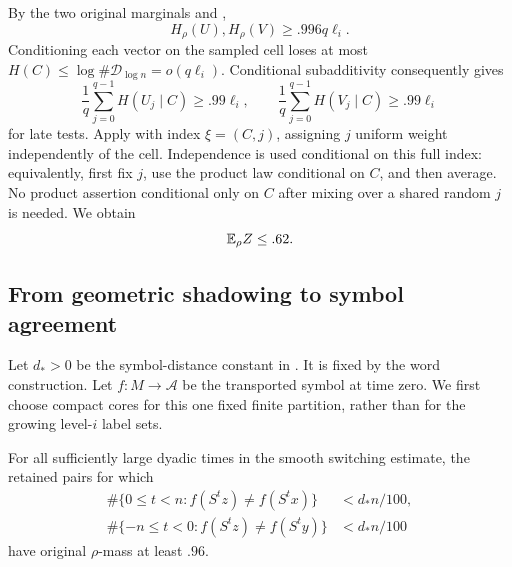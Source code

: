 By the two original marginals and ,
\[
 H_\rho(U),H_\rho(V)\ge .996q\ell_i.
\]
Conditioning each vector on the sampled cell loses at most
$H(C)\le\log\#\mathcal D_{\log n}=o(q\ell_i)$. Conditional
subadditivity consequently gives
\begin{equation}\label{eq:entry-entropies}
 \frac1q\sum_{j=0}^{q-1}H(U_j\mid C)\ge .99\ell_i,
 \qquad
 \frac1q\sum_{j=0}^{q-1}H(V_j\mid C)\ge .99\ell_i
\end{equation}
for late tests. Apply  with index
$\xi=(C,j)$, assigning $j$ uniform weight independently of the
cell. Independence is used conditional on this full index:
equivalently, first fix $j$, use the product law conditional
on $C$, and then average. No product assertion conditional only
on $C$ after mixing over a shared random $j$ is needed.
We obtain
\begin{equation}\label{eq:passing-upper}
 \mathbb E_\rho Z\le .62.
\end{equation}

\subsection{From geometric shadowing to symbol agreement}

Let $d_*>0$ be the symbol-distance constant in
. It is fixed by the word construction.
Let $f:M\to\mathcal A$ be the transported symbol at time zero.
We first choose compact cores for this one fixed finite
partition, rather than for the growing level-$i$ label sets.

\begin{lemma}\label{lem:symbol-matching}
For all sufficiently large dyadic times in the smooth switching
estimate, the retained pairs for which
\begin{align}
 \#\{0\le t<n:f(S^tz)\ne f(S^tx)\}
       &<d_*n/100,\label{eq:future-symbol-match}\\
 \#\{-n\le t<0:f(S^tz)\ne f(S^ty)\}
       &<d_*n/100\label{eq:past-symbol-match}
\end{align}
have original $\rho$-mass at least $.96$.
\end{lemma}

